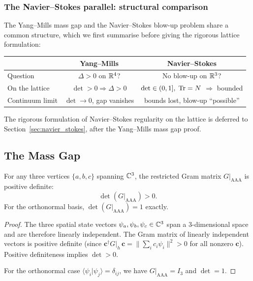 \subsubsection{The Navier--Stokes parallel: structural comparison}
\label{sec:navier_stokes_parallel}

The Yang--Mills mass gap and the Navier--Stokes blow-up problem share
a common structure, which we first summarise before giving the
rigorous lattice formulation:

\begin{center}
\begin{tabular}{lcc}
\hline
& Yang--Mills & Navier--Stokes \\
\hline
Question & $\Delta > 0$ on $\mathbb{R}^4$? & No blow-up on $\mathbb{R}^3$? \\
On the lattice & $\det > 0 \Rightarrow \Delta > 0$ &
  $\det \in (0,1],\;\operatorname{Tr} = N$ $\Rightarrow$ bounded \\
Continuum limit & $\det \to 0$, gap vanishes &
  bounds lost, blow-up ``possible'' \\
\hline
\end{tabular}
\end{center}

The rigorous formulation of Navier--Stokes regularity on the lattice
is deferred to Section~\ref{sec:navier_stokes}, after the Yang--Mills
mass gap proof.

\subsection{The Mass Gap}
\label{sec:massgap}

\begin{lemma}
\label{lem:det}
For any three vertices $\{a, b, c\}$ spanning $\mathbb{C}^3$, the
restricted Gram matrix $G|_{\mathrm{AAA}}$ is positive definite:
\begin{equation}
\det(G|_{\mathrm{AAA}}) > 0.
\end{equation}
For the orthonormal basis, $\det(G|_{\mathrm{AAA}}) = 1$ exactly.
\end{lemma}

\begin{proof}
The three spatial state vectors $\psi_a, \psi_b, \psi_c \in \mathbb{C}^3$
span a 3-dimensional space and are therefore linearly independent.
The Gram matrix of linearly independent vectors is positive definite
(since $\mathbf{c}^\dagger G|_h\, \mathbf{c} =
\|\sum_i c_i \psi_i\|^2 > 0$ for all nonzero $\mathbf{c}$).
Positive definiteness implies $\det > 0$.

For the orthonormal case $\langle \psi_i | \psi_j \rangle = \delta_{ij}$,
we have $G|_{\mathrm{AAA}} = I_3$ and $\det = 1$.
\end{proof}

